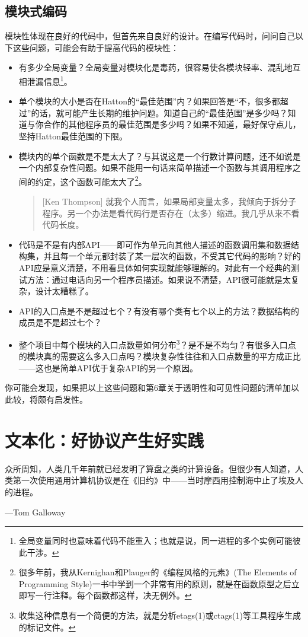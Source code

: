 \documentclass[12pt,oneside]{book}
\begin{document}
\section{模块式编码}
模块性体现在良好的代码中，但首先来自良好的设计。在编写代码时，问问自己以下这些问题，可能会有助于提高代码的模块性：
\begin{itemize}
\item 有多少全局变量？全局变量对模块化是毒药，很容易使各模块轻率、混乱地互相泄漏信息\footnote{全局变量同时也意味着代码不能重入；也就是说，同一进程的多个实例可能彼此干涉。}。
\item 单个模块的大小是否在Hatton的“最佳范围”内？如果回答是“不，很多都超过”的话，就可能产生长期的维护问题。知道自己的“最佳范围”是多少吗？知道与你合作的其他程序员的最佳范围是多少吗？如果不知道，最好保守点儿，坚持Hatton最佳范围的下限。
\item 模块内的单个函数是不是太大了？与其说这是一个行数计算问题，还不如说是一个内部复杂性问题。如果不能用一句话来简单描述一个函数与其调用程序之间的约定，这个函数可能太大了\footnote{很多年前，我从Kernighan和Plauger的《编程风格的元素》(The Elements of Programming Style)一书中学到一个非常有用的原则，就是在函数原型之后立即写一行注释。每个函数都这样，决无例外。}。
\begin{quote}[Ken Thompson]
就我个人而言，如果局部变量太多，我倾向于拆分子程序。另一个办法是看代码行是否存在（太多）缩进。我几乎从来不看代码长度。
\end{quote}
\item 代码是不是有内部API——即可作为单元向其他人描述的函数调用集和数据结构集，并且每一个单元都封装了某一层次的函数，不受其它代码的影响？好的API应是意义清楚，不用看具体如何实现就能够理解的。对此有一个经典的测试方法：通过电话向另一个程序员描述。如果说不清楚，API很可能就是太复杂，设计太糟糕了。
\item API的入口点是不是超过七个？有没有哪个类有七个以上的方法？数据结构的成员是不是超过七个？
\item 整个项目中每个模块的入口点数量如何分布\footnote{收集这种信息有一个简便的方法，就是分析etags(1)或ctags(1)等工具程序生成的标记文件。}？是不是不均匀？有很多入口点的模块真的需要这么多入口点吗？模块复杂性往往和入口点数量的平方成正比——这也是简单API优于复杂API的另一个原因。
\end{itemize}

你可能会发现，如果把以上这些问题和第6章关于透明性和可见性问题的清单加以此较，将颇有启发性。



\chapter{文本化：好协议产生好实践}
\begin{flushright}
 众所周知，人类几千年前就已经发明了算盘之类的计算设备。但很少有人知道，人类第一次使用通用计算机协议是在《旧约》中——当时摩西用控制海中止了埃及人的进程。
 
{\hfill —Tom Galloway}
\end{flushright}
\end{document}
